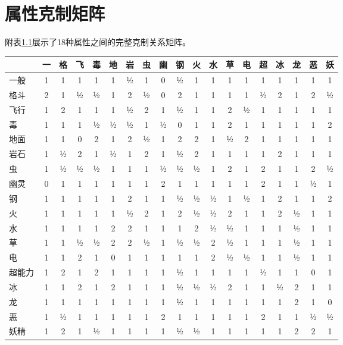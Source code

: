 \chapter{属性克制矩阵}\label{app:typechart}

附表\ref{tab:full-type-chart}展示了18种属性之间的完整克制关系矩阵。

\begin{table}[!htbp]
    \label{tab:full-type-chart}
    \centering
    \footnotesize
    \setlength{\tabcolsep}{2pt}
    \begin{tabular}{l|cccccccccccccccccc}
        \hline
        & 一 & 格 & 飞 & 毒 & 地 & 岩 & 虫 & 幽 & 钢 & 火 & 水 & 草 & 电 & 超 & 冰 & 龙 & 恶 & 妖 \\
        \hline
        一般  & 1 & 1 & 1 & 1 & 1 & ½& 1 & 0 & ½& 1 & 1 & 1 & 1 & 1 & 1 & 1 & 1 & 1 \\
        格斗  & 2 & 1 & ½& ½& 1 & 2 & ½& 0 & 2 & 1 & 1 & 1 & 1 & ½& 2 & 1 & 2 & ½\\
        飞行  & 1 & 2 & 1 & 1 & 1 & ½& 2 & 1 & ½& 1 & 1 & 2 & ½& 1 & 1 & 1 & 1 & 1 \\
        毒  & 1 & 1 & 1 & ½& ½& ½& 1 & ½& 0 & 1 & 1 & 2 & 1 & 1 & 1 & 1 & 1 & 2 \\
        地面  & 1 & 1 & 0 & 2 & 1 & 2 & ½& 1 & 2 & 2 & 1 & ½& 2 & 1 & 1 & 1 & 1 & 1 \\
        岩石  & 1 & ½& 2 & 1 & ½& 1 & 2 & 1 & ½& 2 & 1 & 1 & 1 & 1 & 2 & 1 & 1 & 1 \\
        虫  & 1 & ½& ½& ½& 1 & 1 & 1 & ½& ½& ½& 1 & 2 & 1 & 2 & 1 & 1 & 2 & ½\\
        幽灵  & 0 & 1 & 1 & 1 & 1 & 1 & 1 & 2 & 1 & 1 & 1 & 1 & 1 & 2 & 1 & 1 & ½& 1 \\
        钢  & 1 & 1 & 1 & 1 & 1 & 2 & 1 & 1 & ½& ½& ½& 1 & ½& 1 & 2 & 1 & 1 & 2 \\
        火  & 1 & 1 & 1 & 1 & 1 & ½& 2 & 1 & 2 & ½& ½& 2 & 1 & 1 & 2 & ½& 1 & 1 \\
        水  & 1 & 1 & 1 & 1 & 2 & 2 & 1 & 1 & 1 & 2 & ½& ½& 1 & 1 & 1 & ½& 1 & 1 \\
        草  & 1 & 1 & ½& ½& 2 & 2 & ½& 1 & ½& ½& 2 & ½& 1 & 1 & 1 & ½& 1 & 1 \\
        电  & 1 & 1 & 2 & 1 & 0 & 1 & 1 & 1 & 1 & 1 & 2 & ½& ½& 1 & 1 & ½& 1 & 1 \\
        超能力& 1 & 2 & 1 & 2 & 1 & 1 & 1 & 1 & ½& 1 & 1 & 1 & 1 & ½& 1 & 1 & 0 & 1 \\
        冰  & 1 & 1 & 2 & 1 & 2 & 1 & 1 & 1 & ½& ½& ½& 2 & 1 & 1 & ½& 2 & 1 & 1 \\
        龙  & 1 & 1 & 1 & 1 & 1 & 1 & 1 & 1 & ½& 1 & 1 & 1 & 1 & 1 & 1 & 2 & 1 & 0 \\
        恶  & 1 & ½& 1 & 1 & 1 & 1 & 1 & 2 & 1 & 1 & 1 & 1 & 1 & 2 & 1 & 1 & ½& ½\\
        妖精  & 1 & 2 & 1 & ½& 1 & 1 & 1 & 1 & ½& ½& 1 & 1 & 1 & 1 & 1 & 2 & 2 & 1 \\
        \hline
    \end{tabular}
\end{table}

